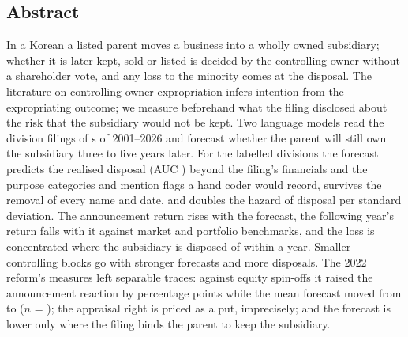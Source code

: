 \subsection*{Abstract}
\noindent In a Korean \captive{} a listed parent moves a business into a wholly owned subsidiary; whether it is later kept, sold or listed is decided by the controlling owner without a shareholder vote, and any loss to the minority comes at the disposal. The literature on controlling-owner expropriation infers intention from the expropriating outcome; we measure beforehand what the filing disclosed about the risk that the subsidiary would not be kept. Two language models read the division filings of \NScored{} \captive{}s of 2001--2026 and forecast whether the parent will still own the subsidiary three to five years later. For the \NGateOne{} labelled divisions the forecast predicts the realised disposal (AUC \AUCPooledLLM{}) beyond the filing's financials and the purpose categories and mention flags a hand coder would record, survives the removal of every name and date, and doubles the hazard of disposal per standard deviation. The announcement return rises with the forecast, the following year's return falls with it against market and portfolio benchmarks, and the loss is concentrated where the subsidiary is disposed of within a year. Smaller controlling blocks go with stronger forecasts and more disposals. The 2022 reform's measures left separable traces: against equity spin-offs it raised the announcement reaction by \DiDCxP{} percentage points while the mean forecast moved from \ScorePre{} to \ScorePost{} ($n$ = \ProtPostN{}); the appraisal right is priced as a put, imprecisely; and the forecast is lower only where the filing binds the parent to keep the subsidiary.
\par{}
